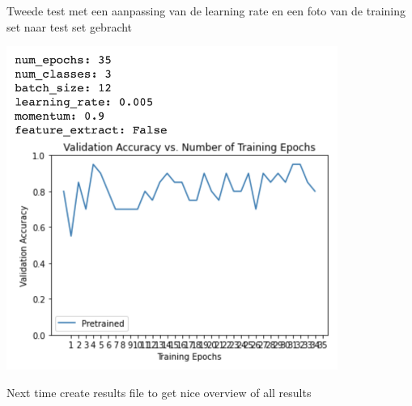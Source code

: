 Tweede test met een aanpassing van de learning rate en een foto van de training set naar test set gebracht

\includegraphics[height=4.166667in, keepaspectratio=true]{./fig/Vision/GoogleColab/Test_Camera_Setup/Resnet18/Screenshot 2020-11-18 at 23.13.23.png}



Next time create results file to get nice overview of all results


